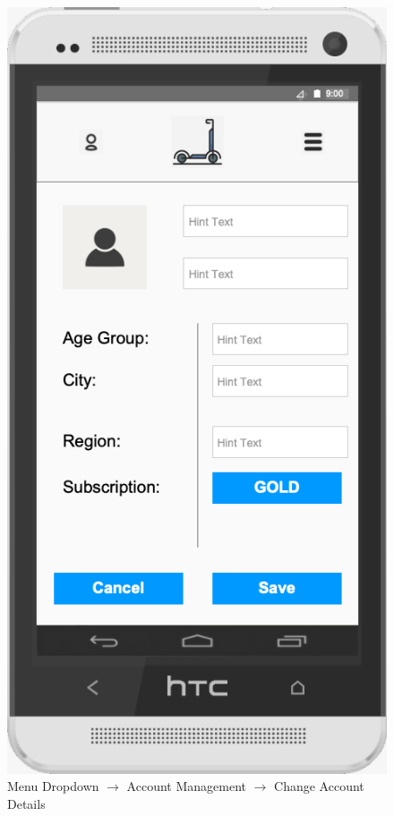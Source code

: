 \documentclass[a4paper, 12pt]{article}
\begin{document}
\begin{figure} [htbp]
  \begin{center}
    \includegraphics[scale=0.5]{images/prototypes/03-01-01-menu-dropdown--account-management--change-account-details.png}
  \end{center}
  \caption{Menu Dropdown $\rightarrow$ Account Management $\rightarrow$ Change Account Details}
\end{figure}
\end{document}
